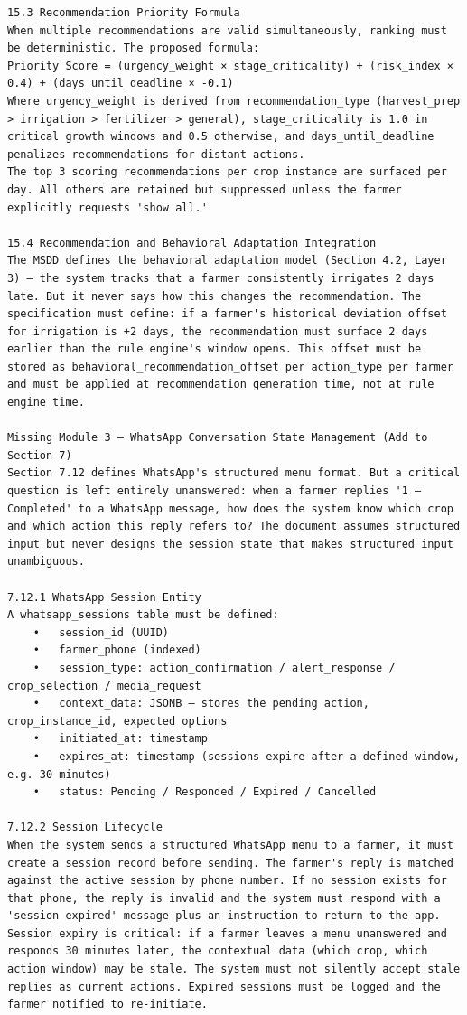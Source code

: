 \documentclass{article}
\begin{document}
\begin{verbatim}
15.3 Recommendation Priority Formula
When multiple recommendations are valid simultaneously, ranking must be deterministic. The proposed formula:
Priority Score = (urgency_weight × stage_criticality) + (risk_index × 0.4) + (days_until_deadline × -0.1)
Where urgency_weight is derived from recommendation_type (harvest_prep > irrigation > fertilizer > general), stage_criticality is 1.0 in critical growth windows and 0.5 otherwise, and days_until_deadline penalizes recommendations for distant actions.
The top 3 scoring recommendations per crop instance are surfaced per day. All others are retained but suppressed unless the farmer explicitly requests 'show all.'

15.4 Recommendation and Behavioral Adaptation Integration
The MSDD defines the behavioral adaptation model (Section 4.2, Layer 3) — the system tracks that a farmer consistently irrigates 2 days late. But it never says how this changes the recommendation. The specification must define: if a farmer's historical deviation offset for irrigation is +2 days, the recommendation must surface 2 days earlier than the rule engine's window opens. This offset must be stored as behavioral_recommendation_offset per action_type per farmer and must be applied at recommendation generation time, not at rule engine time.

Missing Module 3 — WhatsApp Conversation State Management (Add to Section 7)
Section 7.12 defines WhatsApp's structured menu format. But a critical question is left entirely unanswered: when a farmer replies '1 — Completed' to a WhatsApp message, how does the system know which crop and which action this reply refers to? The document assumes structured input but never designs the session state that makes structured input unambiguous.

7.12.1 WhatsApp Session Entity
A whatsapp_sessions table must be defined:
	•	session_id (UUID)
	•	farmer_phone (indexed)
	•	session_type: action_confirmation / alert_response / crop_selection / media_request
	•	context_data: JSONB — stores the pending action, crop_instance_id, expected options
	•	initiated_at: timestamp
	•	expires_at: timestamp (sessions expire after a defined window, e.g. 30 minutes)
	•	status: Pending / Responded / Expired / Cancelled

7.12.2 Session Lifecycle
When the system sends a structured WhatsApp menu to a farmer, it must create a session record before sending. The farmer's reply is matched against the active session by phone number. If no session exists for that phone, the reply is invalid and the system must respond with a 'session expired' message plus an instruction to return to the app.
Session expiry is critical: if a farmer leaves a menu unanswered and responds 30 minutes later, the contextual data (which crop, which action window) may be stale. The system must not silently accept stale replies as current actions. Expired sessions must be logged and the farmer notified to re-initiate.


\end{verbatim}
\end{document}
